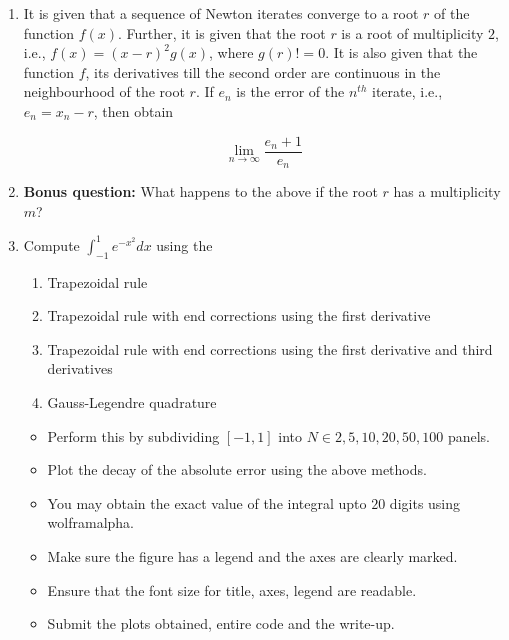 \documentclass{article}
\begin{document}
\begin{enumerate}
        \item It is given that a sequence of Newton iterates converge to a root $r$ of the
        function $f(x)$. Further, it is given that the root $r$ is a root of multiplicity
        $2$, i.e., $f(x) = (x - r)^{2} g(x)$, where $g(r) != 0$. It is also given that the
        function $f$, its derivatives till the second order are continuous in the
        neighbourhood of the root $r$. If $e_{n}$ is the error of the $n^{th}$ iterate,
        i.e., $e_{n} = x_{n} - r$, then obtain

            \begin{equation*}
                \lim_{n \rightarrow \infty} \frac{e_{n} + 1}{e_{n}}
            \end{equation*}

        \item \textbf{Bonus question:} What happens to the above if the root $r$ has a
        multiplicity $m$?

        \item Compute $\displaystyle \int_{-1}^{1} e^{-x^{2}} dx$ using the 

            \begin{enumerate}
                \item Trapezoidal rule
                \item Trapezoidal rule with end corrections using the first derivative
                \item Trapezoidal rule with end corrections using the first derivative and
                third derivatives
                \item Gauss-Legendre quadrature
            \end{enumerate}

            \begin{itemize}
                \item Perform this by subdividing $[-1, 1]$ into $N \in {2, 5, 10, 20, 50,
                100}$ panels.
                \item Plot the decay of the absolute error using the above methods.
                \item You may obtain the exact value of the integral upto $20$ digits
                using wolframalpha.
                \item Make sure the figure has a legend and the axes are clearly marked.
                \item Ensure that the font size for title, axes, legend are readable.
                \item Submit the plots obtained, entire code and the write-up.
            \end{itemize}


\end{enumerate}
\end{document}

